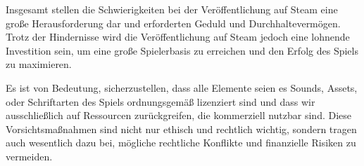 Insgesamt stellen die Schwierigkeiten bei der Veröffentlichung auf Steam eine große Herausforderung dar und erforderten Geduld und Durchhaltevermögen.
Trotz der Hindernisse wird die Veröffentlichung auf Steam jedoch eine lohnende Investition sein, um eine große Spielerbasis zu erreichen und den Erfolg des Spiels zu maximieren.



Es ist von Bedeutung, sicherzustellen, dass alle Elemente seien es Sounds, Assets, oder Schriftarten des Spiels ordnungsgemäß lizenziert sind und dass wir ausschließlich auf Ressourcen zurückgreifen, die kommerziell nutzbar sind.
Diese Vorsichtsmaßnahmen sind nicht nur ethisch und rechtlich wichtig, sondern tragen auch wesentlich dazu bei, mögliche rechtliche Konflikte und finanzielle Risiken zu vermeiden.

%

\renewcommand{\kapitelautor}{}